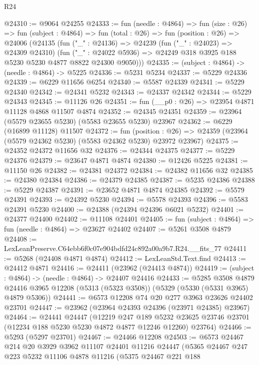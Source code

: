 \begin{lexlean}{R24}
\begin{coremodule}
@24310 := @9064 @24255
@24333 := fun (needle : @4864) =>
  fun (size : @26) =>
  fun (subject : @4864) =>
  fun (total : @26) =>
  fun (position : @26) =>
  @24006
    (@24135
      (fun ("_" : @24136) =>
      @24239
        (fun ("_" : @24023) => @24309 @24310)
        (fun ("_" : @24022 @5936) => @24249 @318 @3925 @188 @5230 @5230 @4877 @8822 @24300 @9050)))
@24335 := (subject : @4864) -> (needle : @4864) -> @5225
@24336 := @5231 @5234
@24337 := @5229 @24336
@24339 := @6229 @11656 @6254
@24340 := @5587 @24339
@24341 := @5229 @24340
@24342 := @24341 @5232
@24343 := @24337 @24342
@24344 := @5229 @24343
@24345 := @11126 @26
@24351 := fun (__p0 : @26) => @23954 @4871 @11128 @4868 @11507 @4874
@24352 := @24345 @24351
@24359 := @23964 (@5579 @23655 @5230) (@5583 @23655 @5230) @23967
@24362 := @6229 (@16899 @11128) @11507
@24372 := fun (position : @26) =>
  @24359 (@23964 (@5579 @24362 @5230) (@5583 @24362 @5230) @23972 @23967)
@24375 := @24352 @24372 @11656 @32
@24376 := @24344 @24375
@24377 := @5229 @24376
@24379 := @23647 @4871 @4874
@24380 := @12426 @5225
@24381 := @11150 @26
@24382 := @24381 @24372
@24384 := @24382 @11656 @32
@24385 := @24380 @24384
@24386 := @24379 @24385
@24387 := @5235 @24386
@24388 := @5229 @24387
@24391 := @23652 @4871 @4874 @24385
@24392 := @5579 @24391
@24393 := @24392 @5230
@24394 := @5578 @24393
@24396 := @5583 @24391 @5230
@24400 := @24388 (@24394 @24396 @6021 @5232)
@24401 := @24377 @24400
@24402 := @11108 @24401
@24405 := fun (subject : @4864) => fun (needle : @4864) => @23627 @24402
@24407 := @5261 @3508 @4879
@24408 := LexLeanPreserve.C64ebb6f0c07e904bdfd24c892a00a9b7.R24.__fits_77
@24411 := @5268 (@24408 @4871 @4874)
@24412 := LexLeanStd.Text.find
@24413 := @24412 @4871
@24416 := @24411 (@23962 (@24413 @4874))
@24419 := (subject : @4864) -> (needle : @4864) -> @24407 @24416
@24433 := @5285
    @3508
    @4879
    @24416
    @3965
    @12208
    (@5313 (@5323 @3508))
    (@5329 (@5330 (@5331 @3965) @4879 @5306))
@24441 := @6573 @12208 @74 @20 @277 @3963 @23626 @24402 @23701
@24447 := @23962 (@23964 @24393 @24396 (@23971 @24385) @23967)
@24464 := @24441
    @24447
    (@12219
      @247
      @189
      @5232
      @23625
      @23746
      @23701
      (@12234 @188 @5230 @5230 @4872 @4877 @12246 @12260)
      @23764)
@24466 := @5293 (@5297 @23701)
@24467 := @24466 @12208
@24503 := @6573
    @24467
    @214
    @20
    @3929
    @3962
    @11107
    @24401
    @11216
    @24447
    (@5365
      @24467
      @247
      @223
      @5232
      @11106
      @4878
      @11216
      (@5375
        @24467
        @221
        @188

\end{coremodule}
\end{lexlean}
